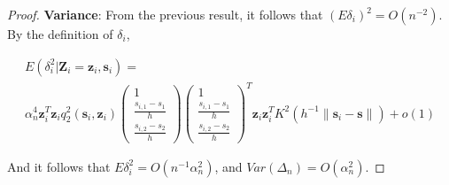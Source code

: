 \documentclass[authoryear,review, 12pt]{elsarticle}
\begin{document}
\begin{proof}
\textbf{Variance}: From the previous result, it follows that $\left(E\delta_{i}\right)^{2}=O\left(n^{-2}\right)$.
By the definition of $\delta_{i}$,

\begin{multline*}
E\left(\delta_{i}^{2}|\bm{Z}_{i}=\bm{z}_{i},\bm{s}_{i}\right)=\\
\alpha_{n}^{4}\bm{z}_{i}^{T}\bm{z}_{i}q_{2}^{2}\left(\bm{s}_{i},\bm{z}_{i}\right)\left(\begin{array}{c}
1\\
\frac{s_{i,1}-s_{1}}{h}\\
\frac{s_{i,2}-s_{2}}{h}
\end{array}\right)\left(\begin{array}{c}
1\\
\frac{s_{i,1}-s_{1}}{h}\\
\frac{s_{i,2}-s_{2}}{h}
\end{array}\right)^{T}\bm{z}_{i}\bm{z}_{i}^{T}K^{2}\left(h^{-1}\|\bm{s}_{i}-\bm{s}\|\right)+o\left(1\right)
\end{multline*}


And it follows that $E\delta_{i}^{2}=O\left(n^{-1}\alpha_{n}^{2}\right)$,
and $Var\left(\Delta_{n}\right)=O\left(\alpha_{n}^{2}\right)$.
\end{proof}



\end{document}
